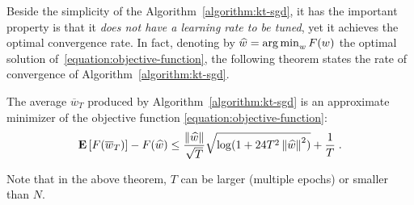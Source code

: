 Beside the simplicity of the Algorithm~\ref{algorithm:kt-sgd}, it has the
important property is that it \emph{does not have a learning rate to be tuned},
yet it achieves the optimal convergence rate. In fact, denoting by $\widehat{w} = \operatorname*{arg\,min}_w F(w)$
the optimal solution of~\eqref{equation:objective-function}, the following
theorem states the rate of convergence of Algorithm~\ref{algorithm:kt-sgd}.
%
\begin{theorem}
The average $\overline{w}_T$ produced by Algorithm~\ref{algorithm:kt-sgd} is
an approximate minimizer of the objective function \eqref{equation:objective-function}:
\[
\operatorname*{\mathbf{E}}\left[F(\overline{w}_T)\right] - F(\widehat{w}) \leq \frac{\left\|{\widehat{w}}\right\|}{\sqrt{T}} \sqrt{\log(1+24 T^2 \left\|{\widehat{w}}\right\|^2)} +\frac{1}{T} \; .
\]
\end{theorem}
%
Note that in the above theorem, $T$ can be larger (multiple epochs) or smaller
than $N$.


